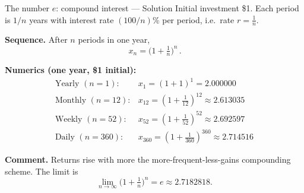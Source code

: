 \documentclass[9pt]{beamer}
\begin{document}
\begin{frame}{The number $e$: compound interest — Solution}
\footnotesize
Initial investment \$1. Each period is $1/n$ years with interest rate $(100/n)\%$ per period, i.e.\ rate $r=\tfrac{1}{n}$.

\medskip
\textbf{Sequence.} After $n$ periods in one year,
\[
\boxed{\,x_n=\bigl(1+\tfrac{1}{n}\bigr)^{n}\,}.
\]


\medskip
\textbf{Numerics (one year, \$1 initial):}
\[
\begin{array}{lcl}
\text{Yearly }(n=1): & x_1=(1+1)^1 = \boxed{2.000000} \\
\text{Monthly }(n=12): & x_{12}=(1+\tfrac{1}{12})^{12} \approx \boxed{2.613035} \\
\text{Weekly }(n=52): & x_{52}=(1+\tfrac{1}{52})^{52} \approx \boxed{2.692597} \\
\text{Daily }(n=360): & x_{360}=(1+\tfrac{1}{360})^{360} \approx \boxed{2.714516}
\end{array}
\]

\medskip
\textbf{Comment.} Returns rise with more the more-frequent-less-gains compounding scheme. The limit is
\[
\lim_{n\to\infty}\bigl(1+\tfrac{1}{n}\bigr)^n = \boxed{e \approx 2.7182818}.
\]
\end{frame}



        
        
    
\end{document}
